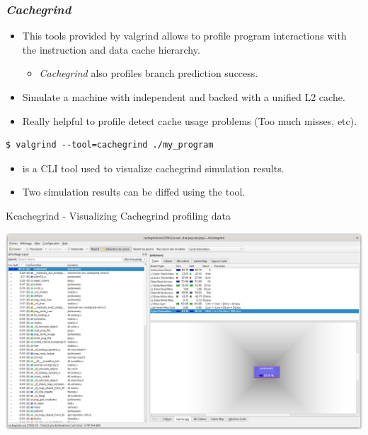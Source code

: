 \begin{frame}[fragile]
  \frametitle{{\em Cachegrind}}
  \begin{itemize}
    \item This tools provided by valgrind allows to profile program interactions
          with the instruction and data cache hierarchy.
    \begin{itemize}
      \item {\em Cachegrind} also profiles branch prediction success.
    \end{itemize}
    \item Simulate a machine with independent  and  backed
          with a unified L2 cache.
    \item Really helpful to profile detect cache usage problems (Too much misses, etc).
  \end{itemize}
  \begin{block}{}
    \begin{verbatim}
$ valgrind --tool=cachegrind ./my_program
    \end{verbatim}
  \end{block}
  \begin{itemize}
    \item {} is a CLI tool used to visualize cachegrind
          simulation results.
    \item Two simulation results can be diffed using the  tool.
  \end{itemize}
\end{frame}

\begin{frame}{Kcachegrind - Visualizing Cachegrind profiling data}
  \begin{center}
    \includegraphics[height=0.8\textheight]{slides/debugging-application-profiling/kcachegrind_cachegrind.png}
  \end{center}
\end{frame}

